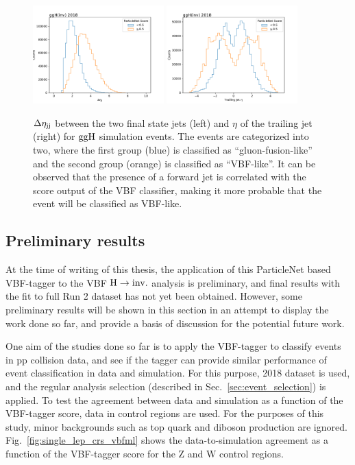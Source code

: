 \begin{figure}[htbp]
    \centering
    \includegraphics[width=0.45\textwidth]{VBFML/ggH_score_overlayed_detajj.pdf}
    \includegraphics[width=0.45\textwidth]{VBFML/ggH_score_overlayed_trailak4_eta.pdf}
    \caption{$\Delta \eta_{\textrm{jj}}$ between the two final state jets (left) and $\eta$ of the trailing jet (right) for $\mathrm{ggH}$ simulation events. 
    The events are categorized into two,
    where the first group (blue) is classified as ``gluon-fusion-like'' and the second group (orange) is classified as ``VBF-like''. It can be observed
    that the presence of a forward jet is correlated with the score output of the VBF classifier, making it more probable 
    that the event will be classified as VBF-like.}
    \label{fig:ggh_dnn_event_kinematics}
    
\end{figure}

\clearpage

\subsection{Preliminary results}

At the time of writing of this thesis, the application of this ParticleNet based VBF-tagger to the VBF $\textrm{H} \rightarrow \textrm{inv.}$ analysis is preliminary, and final
results with the fit to full Run 2 dataset has not yet been obtained. However, some preliminary results will be shown in this section in an attempt
to display the work done so far, and provide a basis of discussion for the potential future work.

One aim of the studies done so far is to apply the VBF-tagger to classify events in pp collision data, and see if the tagger can provide
similar performance of event classification in data and simulation. For this purpose, 2018 dataset is used, and the regular analysis selection
(described in Sec.~\ref{sec:event_selection}) is applied. To test the agreement between data and simulation as a function of the VBF-tagger score,
data in control regions are used. For the purposes of this study, minor backgrounds such as top quark and diboson production are ignored.
Fig.~\ref{fig:single_lep_crs_vbfml} shows the data-to-simulation agreement as a function of the VBF-tagger score for the Z and W control regions.

